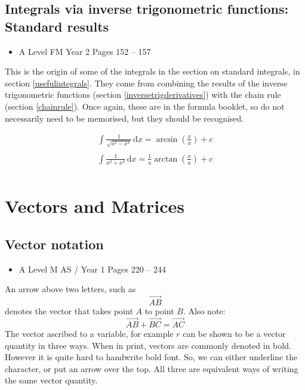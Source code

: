 \documentclass[11pt, a4paper]{article}
\begin{document}
\vspace{0.5cm}


\subsection{Integrals via inverse trigonometric functions: Standard results}
\begin{itemize}
\item A Level FM Year 2 \hspace{1cm} \phantom{AS /} Pages 152 -- 157
\end{itemize} \par
This is the origin of some of the integrals in the section on standard integrals, in section \ref{usefulintegrals}. They come from combining the results of the inverse trigonometric functions (section \ref{inversetrigderivatives}) with the chain rule (section \ref{chainrule}). Once again, these are in the formula booklet, so do not necessarily need to be memorised, but they should be recognised.

\begin{gather*}
\int\frac{1}{\sqrt{a^{2}-x^{2}}}\,\mathrm{d}x=\arcsin\left( \frac{x}{a} \right) + c \\
 \\
\int\frac{1}{a^{2}+x^{2}}\,\mathrm{d}x=\frac{1}{a}\arctan\left( \frac{x}{a} \right) + c \\
\end{gather*}

\vspace{0.5cm}



\clearpage
\section{Vectors and Matrices}
\vspace{0.5cm}

\subsection{Vector notation}
\begin{itemize}
\item A Level M AS / Year 1 \hspace{1cm} \phantom{ } Pages 220 -- 244
\end{itemize} \par
An arrow above two letters, such as
\begin{equation*}
\overrightarrow{AB}
\end{equation*}
 denotes the vector that takes point $A$ to point $B$. Also note:
\begin{equation*}
\overrightarrow{AB}+\overrightarrow{BC}=\overrightarrow{AC}
\end{equation*}
The vector ascribed to a variable, for example $r$ can be shown to be a vector quantity in three ways. When in print, vectors are commonly denoted in bold. However it is quite hard to handwrite bold font. So, we can either underline the character, or put an arrow over the top. All three are equivalent ways of writing the same vector quantity.
\end{document}

